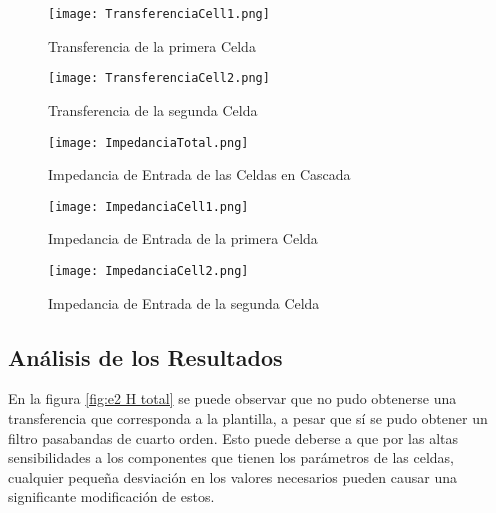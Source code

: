 \begin{figure}[ht]
\begin{center}
\texttt{[image: TransferenciaCell1.png]}
\caption{Transferencia de la primera Celda}
\label{fig:e2 H cell1}
\end{center}
\end{figure}

\begin{figure}[ht]
\begin{center}
\texttt{[image: TransferenciaCell2.png]}
\caption{Transferencia de la segunda Celda}
\label{fig:e2 H cell2}
\end{center}
\end{figure}

\begin{figure}[ht]
\begin{center}
\texttt{[image: ImpedanciaTotal.png]}
\caption{Impedancia de Entrada de las Celdas en Cascada}
\label{fig:e2 Z total}
\end{center}
\end{figure}

\begin{figure}[ht]
\begin{center}
\texttt{[image: ImpedanciaCell1.png]}
\caption{Impedancia de Entrada de la primera Celda}
\label{fig:e2 Z cell1}
\end{center}
\end{figure}

\begin{figure}[ht]
\begin{center}
\texttt{[image: ImpedanciaCell2.png]}
\caption{Impedancia de Entrada de la segunda Celda}
\label{fig:e2 Z cell2}
\end{center}
\end{figure}

\subsection{Análisis de los Resultados}

En la figura \ref{fig:e2 H total} se puede observar que no pudo obtenerse una transferencia que corresponda a la plantilla, a pesar que sí se pudo obtener un filtro pasabandas de cuarto orden. Esto puede deberse a que por las altas sensibilidades a los componentes que tienen los parámetros de las celdas, cualquier pequeña desviación en los valores necesarios pueden causar una significante modificación de estos.


